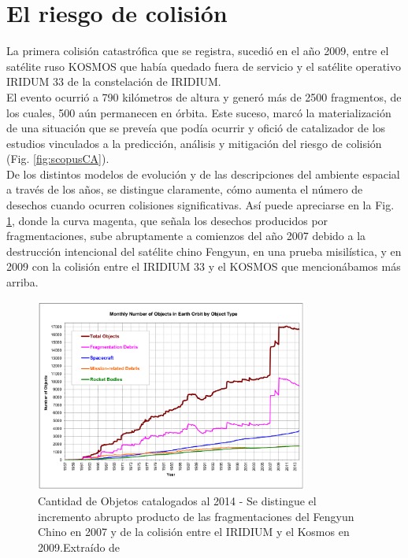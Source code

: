 \section{El riesgo de colisi\'on}

La primera colisi\'on catastr\'ofica que se registra, sucedi\'o en el a\~no 2009, entre el sat\'elite ruso KOSMOS  que hab\'ia quedado fuera de servicio y el sat\'elite operativo IRIDUM 33 de la constelaci\'on de IRIDIUM.\\

El evento ocurri\'o a 790 kil\'ometros de altura y gener\'o m\'as de 2500 fragmentos, de los cuales, 500 a\'un permanecen en \'orbita. Este suceso, marc\'o la materializaci\'on de una situaci\'on que se preve\'ia que pod\'ia ocurrir y ofici\'o de catalizador de los estudios vinculados a la predicci\'on, an\'alisis y mitigaci\'on del riesgo de colisi\'on (Fig. \ref{fig:scopusCA}).\\

De los distintos modelos de evoluci\'on y de las descripciones del ambiente espacial a trav\'es de los a\~nos, se distingue claramente, c\'omo aumenta el n\'umero de desechos cuando ocurren colisiones significativas. As\'i puede apreciarse en la Fig. \ref{fig:cantidad2014}, donde la curva magenta, que se\~nala los desechos producidos por fragmentaciones, sube abruptamente a comienzos del a\~no 2007 debido a la destrucci\'on intencional del sat\'elite chino Fengyun, en una prueba misil\'istica, y en 2009 con la colisi\'on entre el IRIDIUM 33 y el KOSMOS que mencion\'abamos m\'as arriba.\\

\begin{figure}[!h]
  \centering
  \includegraphics[width=0.8\textwidth]{imagenes/numero2014}
  \caption[Cantidad de Objetos catalogados al 2014]{Cantidad de Objetos catalogados al 2014 - Se distingue el incremento abrupto producto de las fragmentaciones del Fengyun Chino en 2007 y de la colisi\'on entre el IRIDIUM y el Kosmos en 2009.Extra\'ido de \citep{ODQN14}}
  \label{fig:cantidad2014}
\end{figure}

